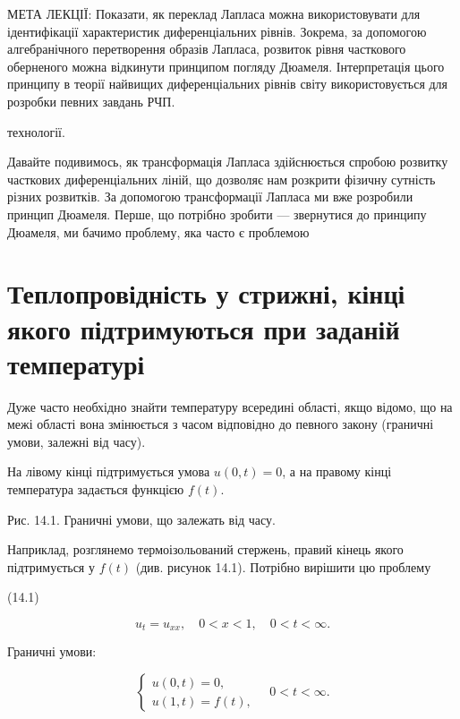 \documentclass[
  ukrainian,
]{article}
\begin{document}
МЕТА ЛЕКЦІЇ: Показати, як переклад Лапласа можна використовувати для
ідентифікації характеристик диференціальних рівнів. Зокрема, за
допомогою алгебранічного перетворення образів Лапласа, розвиток рівня
часткового оберненого можна відкинути принципом погляду Дюамеля.
Інтерпретація цього принципу в теорії найвищих диференціальних рівнів
світу використовується для розробки певних завдань РЧП.

технології.

Давайте подивимось, як трансформація Лапласа здійснюється спробою
розвитку часткових диференціальних ліній, що дозволяє нам розкрити
фізичну сутність різних розвитків. За допомогою трансформації Лапласа ми
вже розробили принцип Дюамеля. Перше, що потрібно зробити --- звернутися
до принципу Дюамеля, ми бачимо проблему, яка часто є проблемою

\section{Теплопровідність у стрижні, кінці якого підтримуються при
заданій
температурі}\label{ux442ux435ux43fux43bux43eux43fux440ux43eux432ux456ux434ux43dux456ux441ux442ux44c-ux443-ux441ux442ux440ux438ux436ux43dux456-ux43aux456ux43dux446ux456-ux44fux43aux43eux433ux43e-ux43fux456ux434ux442ux440ux438ux43cux443ux44eux442ux44cux441ux44f-ux43fux440ux438-ux437ux430ux434ux430ux43dux456ux439-ux442ux435ux43cux43fux435ux440ux430ux442ux443ux440ux456}

Дуже часто необхідно знайти температуру всередині області, якщо відомо,
що на межі області вона змінюється з часом відповідно до певного закону
(граничні умови, залежні від часу).

На лівому кінці підтримується умова \(u(0,t)=0\), а на правому кінці
температура задається функцією \(f(t)\).

Рис. 14.1. Граничні умови, що залежать від часу.

Наприклад, розглянемо термоізольований стержень, правий кінець якого
підтримується у \(f(t)\) (див. рисунок 14.1). Потрібно вирішити цю
проблему

(14.1)

\[
u_t = u_{xx}, \quad 0 < x < 1, \quad 0 < t < \infty.
\]

Граничні умови:

\[
\begin{cases}
u(0, t) = 0, \\
u(1, t) = f(t),
\end{cases}
\quad 0 < t < \infty.
\]
\end{document}
